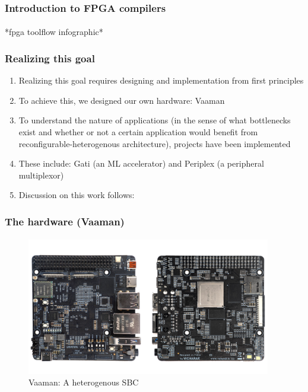 \documentclass{beamer}
\begin{document}
\begin{frame}[fragile]
  \frametitle{Introduction to FPGA compilers}
  \framesubtitle{}
  *fpga toolflow infographic*
\end{frame}

\begin{frame}[fragile]
  \frametitle{Realizing this goal}
  \begin{enumerate}
    \item Realizing this goal requires designing and implementation from
      first principles
    \item To achieve this, we designed our own hardware: Vaaman
    \item To understand the nature of applications (in the sense of what
      bottlenecks exist and whether or not a certain application would
      benefit from reconfigurable-heterogenous architecture), projects have been implemented
    \item These include: Gati (an ML accelerator) and Periplex (a peripheral
      multiplexor)
    \item Discussion on this work follows:
  \end{enumerate}
  \framesubtitle{}
\end{frame}


\begin{frame}[fragile]
  \frametitle{The hardware (Vaaman)}
  \framesubtitle{}
  \begin{figure}
    \centering
    \includegraphics[width=0.95\textwidth]{vaaman.jpg}
    \caption{Vaaman: A heterogenous SBC}
    \label{neuron}
  \end{figure}
\end{frame}
\end{document}
